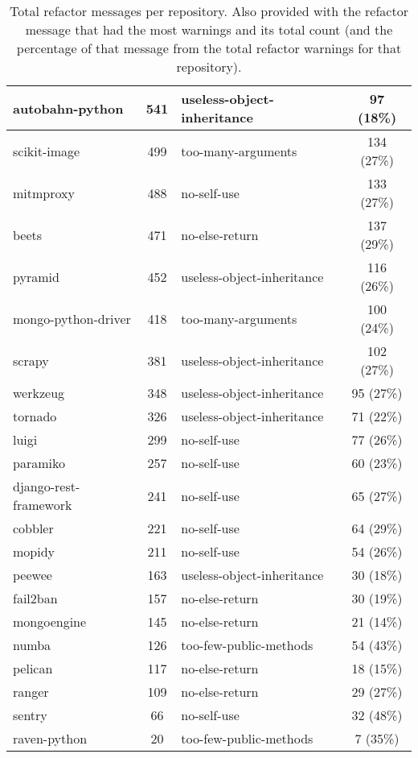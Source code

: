 \begin{table}[ht]
\begin{tabularx}{1.0\textwidth} {
    | l 
    | c
    | >{\centering\arraybackslash}X 
    | c |
  }
    autobahn-python & 541 & useless-object-inheritance & 97 (18\%) \\ \hline
    scikit-image & 499 & too-many-arguments & 134 (27\%) \\ \hline
    mitmproxy & 488 & no-self-use & 133 (27\%) \\ \hline
    beets & 471 & no-else-return & 137 (29\%) \\ \hline
    pyramid & 452 & useless-object-inheritance & 116 (26\%) \\ \hline
    mongo-python-driver & 418 & too-many-arguments & 100 (24\%) \\ \hline
    scrapy & 381 & useless-object-inheritance & 102 (27\%) \\ \hline
    werkzeug & 348 & useless-object-inheritance & 95 (27\%) \\ \hline
    tornado & 326 & useless-object-inheritance & 71 (22\%) \\ \hline
    luigi & 299 & no-self-use & 77 (26\%) \\ \hline
    paramiko & 257 & no-self-use & 60 (23\%) \\ \hline
    django-rest-framework & 241 & no-self-use & 65 (27\%) \\ \hline
    cobbler & 221 & no-self-use & 64 (29\%) \\ \hline
    mopidy & 211 & no-self-use & 54 (26\%) \\ \hline
    peewee & 163 & useless-object-inheritance & 30 (18\%) \\ \hline
    fail2ban & 157 & no-else-return & 30 (19\%) \\ \hline
    mongoengine & 145 & no-else-return & 21 (14\%) \\ \hline
    numba & 126 & too-few-public-methods & 54 (43\%) \\ \hline
    pelican & 117 & no-else-return & 18 (15\%) \\ \hline
    ranger & 109 & no-else-return & 29 (27\%) \\ \hline
    sentry & 66 & no-self-use & 32 (48\%) \\ \hline
    raven-python & 20 & too-few-public-methods & 7 (35\%) \\ \hline
  \end{tabularx}
  \caption{Total refactor messages per repository. Also provided with the refactor message that had the most warnings and its total count (and the percentage of that message from the total refactor warnings for that repository).}
  \label{table:allRefactorWarningTotals}
\end{table}
